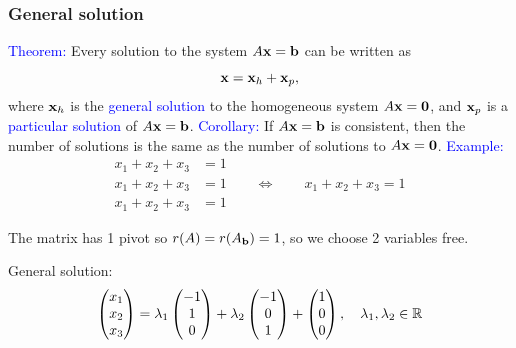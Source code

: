 \documentclass[11pt,aspectratio=169]{beamer}
\begin{document}
\begin{frame}
\frametitle{General solution}
\begin{small}
 \textcolor{blue}{Theorem:} Every solution to the system $A {\bf x}={\bf b}$ can be written as 
$${\bf x}={\bf x}_h+{\bf x}_p,$$where ${\bf x}_h$ is the \textcolor{blue}{general solution} to the homogeneous system
$A{\bf x}={\bf 0}$, and ${\bf x}_p$ is a \textcolor{blue}{particular solution} of $A{\bf x}={\bf b}$.
\vskip 10pt
\textcolor{blue}{Corollary:} If $A{\bf x}={\bf b}$ is consistent, then the number of solutions is the same as the number of solutions to $A{\bf x}={\bf 0}$.
\vskip 10pt
 \textcolor{blue}{Example:}
\begin{equation*}
\begin{split}
x_1+x_2+x_3&=1 \qquad \qquad \qquad  \\
x_1+x_2+x_3&=1 \qquad \Longleftrightarrow \qquad x_1+x_2+x_3=1\\
x_1+x_2+x_3&=1 \qquad \qquad \qquad 
\end{split}
\end{equation*}
\begin{tiny}The matrix has 1 pivot so $r(A)=r(A_{{\bf b}})=1$, so we choose 2 variables free. \end{tiny}
General solution: $$\begin{pmatrix}
x_1\\
x_2\\
x_3
\end{pmatrix}=\lambda_1 \begin{pmatrix}
-1\\
1\\
0
\end{pmatrix}
+\lambda_2 \begin{pmatrix}
-1\\
0\\
1
\end{pmatrix}+\begin{pmatrix}
1\\
0\\
0
\end{pmatrix}, \quad \lambda_1, \lambda_2 \in \mathbb R$$


\end{small}
\end{frame}
\end{document}
